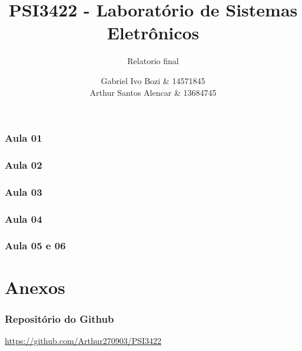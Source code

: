 \documentclass{article}
\title{PSI3422 - Laboratório de Sistemas Eletrônicos}
\subtitle{Relatorio final}
\author{Gabriel Ivo Bozi & 14571845 \\ Arthur Santos Alencar & 13684745}
\begin{document}
\maketitle

\section{Aula 01}
    
\section{Aula 02}
    
\section{Aula 03}
    
\section{Aula 04}
    
\section{Aula 05 e 06}
    
    

\part*{\centering Anexos}
    \section*{Repositório do Github}

    \url{https://github.com/Arthur270903/PSI3422}
\end{document}
